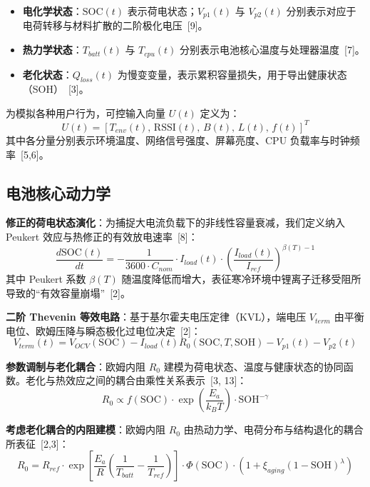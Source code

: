 \documentclass[11pt,a4paper]{ctexart}
\begin{document}
\begin{itemize}
\item \textbf{电化学状态}：$\mathrm{SOC}(t)$ 表示荷电状态；$V_{p1}(t)$ 与 $V_{p2}(t)$ 分别表示对应于电荷转移与材料扩散的二阶极化电压~[9]。
\item \textbf{热力学状态}：$T_{batt}(t)$ 与 $T_{cpu}(t)$ 分别表示电池核心温度与处理器温度~[7]。
\item \textbf{老化状态}：$Q_{loss}(t)$ 为慢变变量，表示累积容量损失，用于导出健康状态（SOH）~[3]。
\end{itemize}

为模拟各种用户行为，可控输入向量 $U(t)$ 定义为：
\begin{equation}
U(t)=\left[T_{env}(t),\,\mathrm{RSSI}(t),\,B(t),\,L(t),\,f(t)\right]^{T}
\end{equation}
其中各分量分别表示环境温度、网络信号强度、屏幕亮度、CPU 负载率与时钟频率~[5,6]。

\subsection{电池核心动力学}

\textbf{修正的荷电状态演化}：为捕捉大电流负载下的非线性容量衰减，我们定义纳入 Peukert 效应与热修正的有效放电速率~[8]：
\begin{equation}
\frac{d\mathrm{SOC}(t)}{dt}=-\frac{1}{3600\cdot C_{nom}}\cdot I_{load}(t)\cdot\left(\frac{I_{load}(t)}{I_{ref}}\right)^{\beta(T)-1}
\end{equation}
其中 Peukert 系数 $\beta(T)$ 随温度降低而增大，表征寒冷环境中锂离子迁移受阻所导致的“有效容量崩塌”~[2]。

\textbf{二阶 Thevenin 等效电路}：基于基尔霍夫电压定律（KVL），端电压 $V_{term}$ 由平衡电位、欧姆压降与瞬态极化过电位决定~[2]：
\begin{equation}
V_{term}(t)=V_{OCV}(\mathrm{SOC})-I_{load}(t)R_0(\mathrm{SOC},T,\mathrm{SOH})-V_{p1}(t)-V_{p2}(t)
\end{equation}

\textbf{参数调制与老化耦合}：欧姆内阻 $R_0$ 建模为荷电状态、温度与健康状态的协同函数。老化与热效应之间的耦合由乘性关系表示~[3, 13]：
\begin{equation}
R_0\propto f(\mathrm{SOC})\cdot\exp\!\left(\frac{E_a}{k_BT}\right)\cdot \mathrm{SOH}^{-\gamma}
\end{equation}

\textbf{考虑老化耦合的内阻建模}：欧姆内阻 $R_0$ 由热动力学、电荷分布与结构退化的耦合所表征~[2,3]：
\begin{equation}
R_0=R_{ref}\cdot\exp\!\left[\frac{E_a}{R}\left(\frac{1}{T_{batt}}-\frac{1}{T_{ref}}\right)\right]\cdot\Phi(\mathrm{SOC})\cdot\left(1+\xi_{aging}(1-\mathrm{SOH})^{\lambda}\right)
\end{equation}
\end{document}
